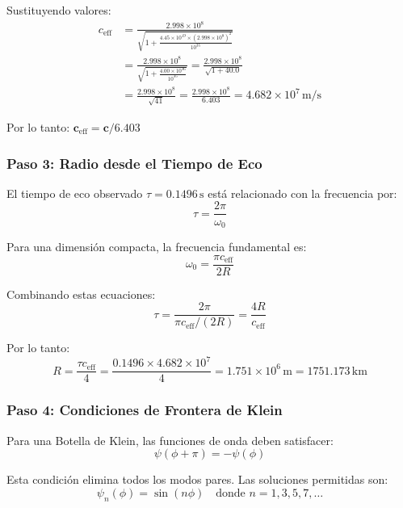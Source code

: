 \documentclass[12pt,a4paper]{article}
\begin{document}
Sustituyendo valores:
\begin{align}
c_\mathrm{eff} &= \frac{2.998 \times 10^8}{\sqrt{1 + \frac{4.45 \times 10^{19} \times (2.998 \times 10^8)^2}{10^{35}}}} \\
&= \frac{2.998 \times 10^8}{\sqrt{1 + \frac{4.00 \times 10^{36}}{10^{35}}}} = \frac{2.998 \times 10^8}{\sqrt{1 + 40.0}} \\
&= \frac{2.998 \times 10^8}{\sqrt{41}} = \frac{2.998 \times 10^8}{6.403} = 4.682 \times 10^7\,\mathrm{m/s}
\end{align}

Por lo tanto: $\mathbf{c_\mathrm{eff} = c/6.403}$

\subsubsection{Paso 3: Radio desde el Tiempo de Eco}

El tiempo de eco observado $\tau = 0.1496\,\mathrm{s}$ está relacionado con la frecuencia por:
\begin{equation}
\tau = \frac{2\pi}{\omega_0}
\end{equation}

Para una dimensión compacta, la frecuencia fundamental es:
\begin{equation}
\omega_0 = \frac{\pi c_\mathrm{eff}}{2R}
\end{equation}

Combinando estas ecuaciones:
\begin{equation}
\tau = \frac{2\pi}{\pi c_\mathrm{eff}/(2R)} = \frac{4R}{c_\mathrm{eff}}
\end{equation}

Por lo tanto:
\begin{equation}
R = \frac{\tau c_\mathrm{eff}}{4} = \frac{0.1496 \times 4.682 \times 10^7}{4} = 1.751 \times 10^6\,\mathrm{m} = 1751.173\,\mathrm{km}
\end{equation}

\subsubsection{Paso 4: Condiciones de Frontera de Klein}

Para una Botella de Klein, las funciones de onda deben satisfacer:
\begin{equation}
\psi(\phi + \pi) = -\psi(\phi)
\end{equation}

Esta condición elimina todos los modos pares. Las soluciones permitidas son:
\begin{equation}
\psi_n(\phi) = \sin(n\phi) \quad \text{donde } n = 1, 3, 5, 7, \ldots
\end{equation}
\end{document}
